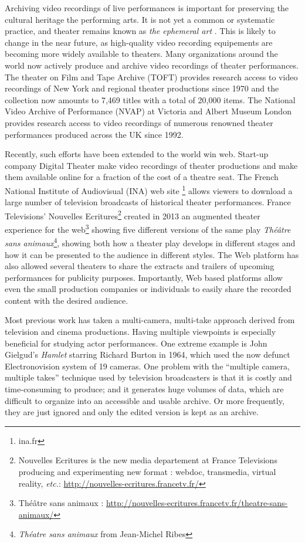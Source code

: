 \documentclass[conference]{IEEEtran}
\begin{document}
Archiving video recordings of live performances is important for preserving the cultural heritage the performing arts. 
It is not yet a common or systematic practice, and theater remains known as {\em the ephemeral art} \cite{Reason06,Bouchez07}. This is likely to change in the near future, as high-quality video recording equipements are becoming more widely available to theaters.   Many organizations around the world now actively produce and archive video recordings of theater performances. The theater on Film and Tape Archive (TOFT) provides research access to video recordings of New York and regional theater productions since 1970 and the collection now amounts to 7,469 titles with a total of 20,000 items. 
The National Video Archive of Performance (NVAP) at Victoria and Albert Museum London
provides research access to video recordings of numerous renowned theater performances produced
across the UK since 1992. 

Recently, such efforts have been extended to the world win web. Start-up company  Digital Theater 
make video recordings of  theater productions  and make them available  online for a fraction of the cost of a theatre seat.
The French National Institute of Audiovisual (INA) web site \footnote{ina.fr} allows viewers to download a large number of  
television broadcasts of historical theater performances. France Televisions' Nouvelles Ecritures\footnote{Nouvelles Ecritures is the new media departement at France Televisions producing and experimenting new format : webdoc, transmedia, virtual reality, \emph{etc.}: \url{http://nouvelles-ecritures.francetv.fr/}}  created in 2013 an augmented theater experience for the web\footnote{Théâtre sans animaux : \url{http://nouvelles-ecritures.francetv.fr/theatre-sans-animaux/}} showing five different versions of the same play \emph{Théâtre sans animaux}\footnote{\emph{Théatre sans animaux} from Jean-Michel Ribes}, showing both how a theater play develops in different stages and how it can be presented to the audience in different styles. The Web platform has also allowed several theaters to share the extracts and trailers of upcoming performances for publicity purposes. Importantly, Web based platforms allow even the small production companies or individuals to easily share the recorded content with the desired audience.

Most previous work has taken a multi-camera, multi-take approach derived from television and cinema productions. Having multiple viewpoints is especially beneficial for studying actor performances.  One extreme example is John Gielgud's  \emph{Hamlet} starring Richard Burton in 1964,  which used  the now defunct Electronovision system of 19 cameras.  One problem with the ``multiple camera, multiple takes'' technique used by television broadcasters  is that it is costly and time-consuming to produce; and it generates huge volumes of data, which are  difficult to organize into an accessible and usable archive. Or more frequently, they are just ignored and only the edited version is kept as an archive. 
\end{document}
